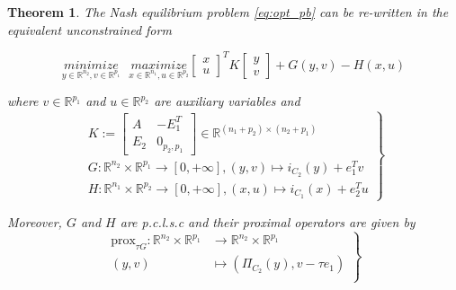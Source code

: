 \documentclass{article} %
\newtheorem{theorem}{Theorem} \newtheorem{lemma}[theorem]{Lemma}
\begin{document}
\begin{theorem}
  The Nash equilibrium problem \eqref{eq:opt_pb} can be re-written in the equivalent unconstrained form
  
  \begin{equation}
    \underset{y \in \mathbb{R}^{n_2}, v\in \mathbb{R}^{p_1}}{minimize}\text{ }\underset{x \in \mathbb{R}^{n_1}, u \in \mathbb{R}^{p_2}}{maximize}
           {\begin{bmatrix}x\\u\end{bmatrix}^TK\begin{bmatrix}y\\v\end{bmatrix} + G(y, v) - H(x, u)}
           \label{eq:unconstrained_pb}
  \end{equation}

  where $v \in \mathbb{R}^{p_1}$ and $u \in \mathbb{R}^{p_2}$ are auxiliary variables and 
  \begin{equation}
    \left .
    \begin{split}
      K :=
      \left[
        \begin{array}{c|c}
          A & -E_1^T \\ \hline
          E_2 & 0_{p_2, p_1}
        \end{array}
        \right] \in \mathbb{R}^{(n_1 + p_2) \times (n_2 + p_1)} \\
      G: \mathbb{R}^{n_2} \times \mathbb{R}^{p_1} \rightarrow [0, +\infty], (y, v) \mapsto i_{C_2}(y) + e_1^Tv\\
      H: \mathbb{R}^{n_1} \times \mathbb{R}^{p_2} \rightarrow [0, +\infty], (x, u) \mapsto i_{C_1}(x) + e_2^Tu
    \end{split}
    \right\}
    \label{eq:things}
  \end{equation}
  
  Moreover, $G$ and $H$ are \textit{p.c.l.s.c} and their proximal operators are given by
  \begin{equation}
    \left .
    \begin{split}
      \text{prox}_{\tau G} : \mathbb{R}^{n_2} \times \mathbb{R}^{p_1} &\rightarrow \mathbb{R}^{n_2} \times \mathbb{R}^{p_1}\\
      (y, v) &\mapsto (\Pi_{C_2}(y), v - \tau e_1)\\
    \end{split}
    \right\}
  \end{equation}


\end{theorem}
\end{document}
